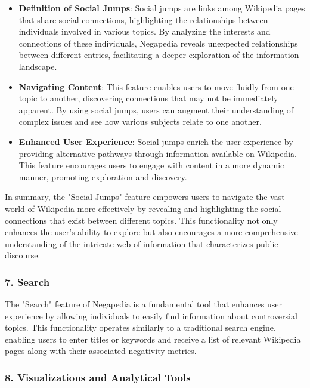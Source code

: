 \begin{itemize}
    \item \textbf{Definition of Social Jumps}: Social jumps are links among Wikipedia pages that share social connections, highlighting the relationships between individuals involved in various topics. By analyzing the interests and connections of these individuals, Negapedia reveals unexpected relationships between different entries, facilitating a deeper exploration of the information landscape.
    
    \item \textbf{Navigating Content}: This feature enables users to move fluidly from one topic to another, discovering connections that may not be immediately apparent. By using social jumps, users can augment their understanding of complex issues and see how various subjects relate to one another.
    
    \item \textbf{Enhanced User Experience}: Social jumps enrich the user experience by providing alternative pathways through information available on Wikipedia. This feature encourages users to engage with content in a more dynamic manner, promoting exploration and discovery.
\end{itemize}

In summary, the "Social Jumps" feature empowers users to navigate the vast world of Wikipedia more effectively by revealing and highlighting the social connections that exist between different topics. This functionality not only enhances the user's ability to explore but also encourages a more comprehensive understanding of the intricate web of information that characterizes public discourse.

\subsubsection{7. Search}

The "Search" feature of Negapedia is a fundamental tool that enhances user experience by allowing individuals to easily find information about controversial topics. This functionality operates similarly to a traditional search engine, enabling users to enter titles or keywords and receive a list of relevant Wikipedia pages along with their associated negativity metrics.

\subsubsection{8. Visualizations and Analytical Tools}

